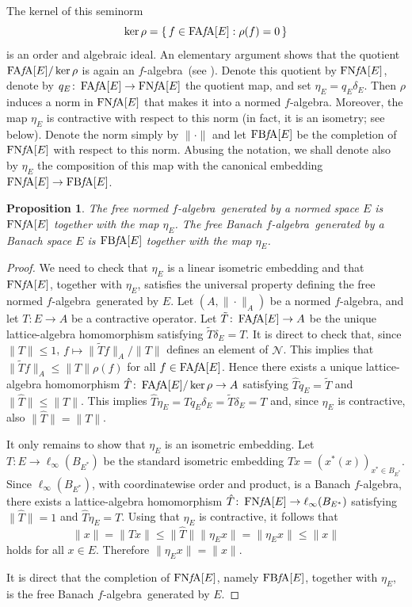 \documentclass{memo-l}
\newtheorem{prop}[theorem]{Proposition}
\theoremstyle{definition}
\theoremstyle{remark}
\numberwithin{section}{chapter}
\numberwithin{equation}{chapter}
\newcommand{\el}[1]{\ensuremath{\ell_{#1}}}
\newcommand{\falg}{$f\!$-algebra}
\newcommand{\FAFAv}[1]{\operatorname{FA{\it f}\!A}[#1]}
\newcommand{\FNFA}[1]{\operatorname{FN{\it f}\!A}[#1]}
\newcommand{\FBFA}[1]{\operatorname{FB{\it f}\!A}[#1]}
\begin{document}
The kernel of this seminorm
\[
\ker \rho =\{\, f \in \FAFAv E : \rho (f)=0 \, \}
\]
is an order and algebraic ideal. An elementary argument shows that the
quotient
$\FAFAv E/\ker \rho $ is again an \falg\ (see \cite[Proposition
3.2]{boulabiar2002}). Denote this quotient by $\FNFA E$, denote by
$q_E\colon \FAFAv E\to \FNFA E$ the quotient map, and set $\eta
_E=q_E\delta _E$. Then $\rho $ induces a norm in $\FNFA E$ that
makes it into a normed \falg. Moreover, the map $\eta _E$ is
contractive with respect to this norm (in fact, it is an isometry; see
below). Denote the norm simply by $\|{\cdot }\|$ and let $\FBFA E$ be the completion
of $\FNFA E$ with respect to this norm.
Abusing the notation, we shall denote also by $\eta _E$ the
composition of this map with the canonical embedding $\FNFA E\to \FBFA
E$.

\begin{prop}\label{prop:free_banach_falg}
    The free normed \falg\ generated by a normed space $E$ is $\FNFA E$
    together with the map $\eta _E$. The free Banach \falg\ generated
    by a Banach space $E$ is $\FBFA E$ together with the map $\eta
    _E$.
\end{prop}
\begin{proof}
    We need to check that $\eta _E$ is a linear isometric embedding
    and that $\FNFA E$, together with $\eta _E$, satisfies
    the universal property defining the free normed \falg\ generated by $E$.
    Let $(A,\|{\cdot }\|_A)$ be a normed \falg, and let $T\colon E\to
    A$ be a contractive operator. Let $\tilde T\colon \FAFAv E\to
    A$ be the unique lattice-algebra homomorphism satisfying $\tilde
    T\delta _E=T$. It is direct to check that, since $\|T\|\le 1$,
    $f\mapsto \|\tilde Tf\|_A/\|T\|$ defines an element of
    $\mathcal{N}$.
    This implies that $\|\tilde Tf\|_A\le \|T\|\rho (f)$ for all $f \in \FAFAv
    E$. Hence there exists a unique lattice-algebra homomorphism
    $\hat{T}\colon \FAFAv E/\ker \rho \to A$ satisfying
    $\hat{T}q_E=\tilde T$ and $\|\hat{T}\|\le \|T\|$. This implies $\hat{T}\eta
    _E=\hat{T}q_E\delta _E=\tilde T \delta _E=T$ and, since $\eta _E$
    is contractive, also $\|\hat{T}\|=\|T\|$.

    It only remains to show that $\eta _E$ is an isometric embedding.
    Let $T\colon E\to \el \infty (B_{E^{*}})$ be the standard
    isometric embedding $Tx=(x^{*}(x))_{x^{*}\in B_{E^{*}}}$. Since
    $\el \infty (B_{E^{*}})$, with coordinatewise order and product,
    is a Banach \falg, there exists a
    lattice-algebra homomorphism $\hat{T}\colon \FNFA E\to \el
    \infty (B_{E^{*}})$ satisfying $\|\hat{T}\|=1$ and $\hat{T}\eta
    _E=T$. Using that $\eta _E$ is contractive, it follows that
    \[
    \|x\|=\|Tx\|\le \|\hat{T}\|\|\eta _Ex\|=\|\eta _Ex\|\le \|x\|
    \]
    holds for all $x \in E$. Therefore $\|\eta _Ex\|=\|x\|$.

    It is direct that the completion of $\FNFA E$, namely
    $\FBFA E$, together with $\eta _E$, is the free Banach \falg\ generated by $E$.
\end{proof}
\end{document}
